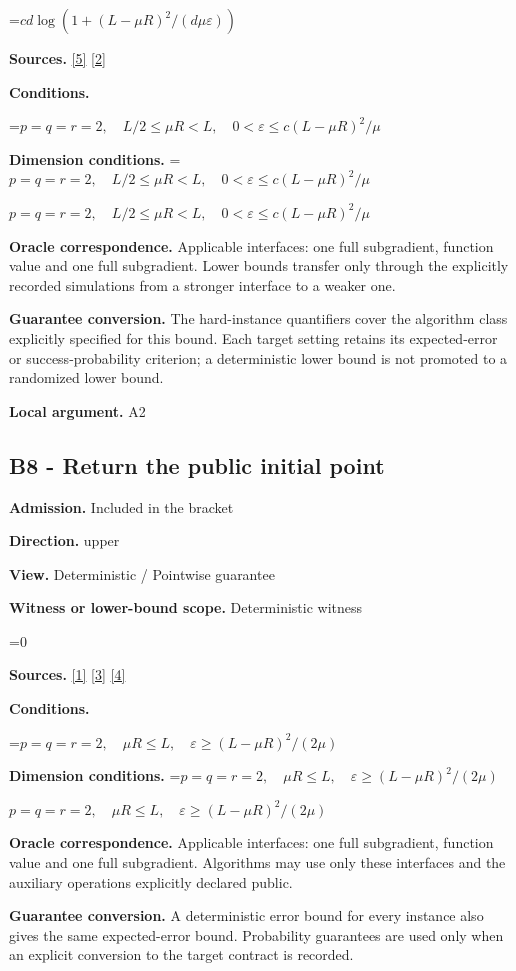 \documentclass[10pt,a4paper]{article}
\newcommand{\AtlasMath}[1]{\par\begingroup\centering\setbox0=\hbox{$\displaystyle #1$}\ifdim\wd0>1.4\linewidth\typeout{ATLAS WIDE FORMULA: \the\wd0}\fi\ifdim\wd0>\linewidth\resizebox{\linewidth}{!}{\box0}\else\box0\fi\par\endgroup}
\newcommand{\AtlasInlineMath}[1]{\begingroup\setbox0=\hbox{$#1$}\ifdim\wd0>.4\linewidth\endgroup\AtlasMath{#1}\else\endgroup$#1$\fi}
\begin{document}
\AtlasMath{cd\log(1+(L-\mu R)^2/(d\mu\varepsilon))}
\textbf{Sources.} \href{https://arxiv.org/pdf/1407.5144}{[5]} \href{https://arxiv.org/pdf/1401.1792}{[2]}

\textbf{Conditions.} 
\AtlasMath{p=q=r=2,\quad L/2\le\mu R<L,\quad0<\varepsilon\le c(L-\mu R)^2/\mu}


\textbf{Dimension conditions.} \AtlasInlineMath{p=q=r=2,\quad L/2\le\mu R<L,\quad0<\varepsilon\le c(L-\mu R)^2/\mu}

\textbf{Oracle correspondence.} Applicable interfaces: one full subgradient, function value and one full subgradient. Lower bounds transfer only through the explicitly recorded simulations from a stronger interface to a weaker one.

\textbf{Guarantee conversion.} The hard-instance quantifiers cover the algorithm class explicitly specified for this bound. Each target setting retains its expected-error or success-probability criterion; a deterministic lower bound is not promoted to a randomized lower bound.

\textbf{Local argument.} A2

\subsection{B8 - Return the public initial point}
\textbf{Admission.} Included in the bracket

\textbf{Direction.} upper

\textbf{View.} Deterministic / Pointwise guarantee

\textbf{Witness or lower-bound scope.} Deterministic witness

\AtlasMath{0}
\textbf{Sources.} \href{https://arxiv.org/pdf/1405.4980}{[1]} \href{https://www2.isye.gatech.edu/~nemirovs/MOR_AccuracyCertificates.pdf}{[3]} \href{https://arxiv.org/pdf/2609.20701}{[4]}

\textbf{Conditions.} 
\AtlasMath{p=q=r=2,\quad\mu R\le L,\quad\varepsilon\ge(L-\mu R)^2/(2\mu)}


\textbf{Dimension conditions.} \AtlasInlineMath{p=q=r=2,\quad\mu R\le L,\quad\varepsilon\ge(L-\mu R)^2/(2\mu)}

\textbf{Oracle correspondence.} Applicable interfaces: one full subgradient, function value and one full subgradient. Algorithms may use only these interfaces and the auxiliary operations explicitly declared public.

\textbf{Guarantee conversion.} A deterministic error bound for every instance also gives the same expected-error bound. Probability guarantees are used only when an explicit conversion to the target contract is recorded.
\end{document}
